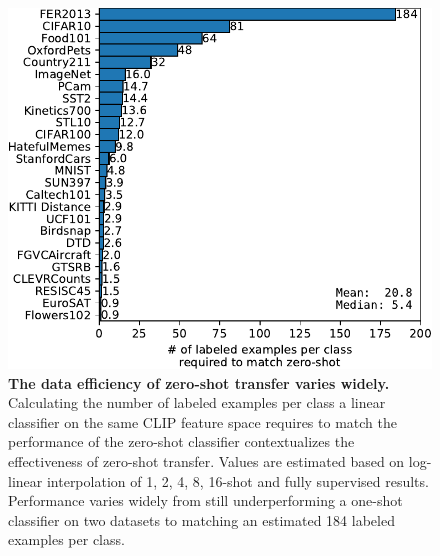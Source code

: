 \documentclass{article}
\begin{document}
\begin{figure}[t]
\begin{center}
\centerline{\includegraphics[width=1.0\columnwidth]{zs-clip-data-efficiency.pdf}}
\caption{\textbf{The data efficiency of zero-shot transfer varies widely.} Calculating the number of labeled examples per class a linear classifier on the same CLIP feature space requires to match the performance of the zero-shot classifier contextualizes the effectiveness of zero-shot transfer. Values are estimated based on log-linear interpolation of 1, 2, 4, 8, 16-shot and fully supervised results. Performance varies widely from still underperforming a one-shot classifier on two datasets to matching an estimated 184 labeled examples per class.}
\label{zeroshot_data_efficiency}
\end{center}
\vspace{-2em}
\end{figure}
\end{document}
